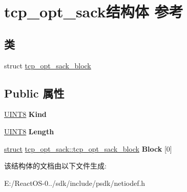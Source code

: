 \hypertarget{structtcp__opt__sack}{}\section{tcp\+\_\+opt\+\_\+sack结构体 参考}
\label{structtcp__opt__sack}
\subsection*{类}
\begin{DoxyCompactItemize}
\item 
struct \hyperlink{structtcp__opt__sack_1_1tcp__opt__sack__block}{tcp\+\_\+opt\+\_\+sack\+\_\+block}
\end{DoxyCompactItemize}
\subsection*{Public 属性}
\begin{DoxyCompactItemize}
\item 
\mbox{\label{structtcp__opt__sack_a49e9cec9fd6a08e546ffb8f47f7cc0c4}} 
\hyperlink{_processor_bind_8h_ab27e9918b538ce9d8ca692479b375b6a}{U\+I\+N\+T8} {\bfseries Kind}
\item 
\mbox{\label{structtcp__opt__sack_a55dab7c72653271b88ca9aad3ec036cf}} 
\hyperlink{_processor_bind_8h_ab27e9918b538ce9d8ca692479b375b6a}{U\+I\+N\+T8} {\bfseries Length}
\item 
\mbox{\label{structtcp__opt__sack_afee52fc59427383bdbac92e023401f73}} 
\hyperlink{interfacestruct}{struct} \hyperlink{structtcp__opt__sack_1_1tcp__opt__sack__block}{tcp\+\_\+opt\+\_\+sack\+::tcp\+\_\+opt\+\_\+sack\+\_\+block} {\bfseries Block} \mbox{[}0\mbox{]}
\end{DoxyCompactItemize}


该结构体的文档由以下文件生成\+:\begin{DoxyCompactItemize}
\item 
E\+:/\+React\+O\+S-\/0../sdk/include/psdk/netiodef.\+h\end{DoxyCompactItemize}
